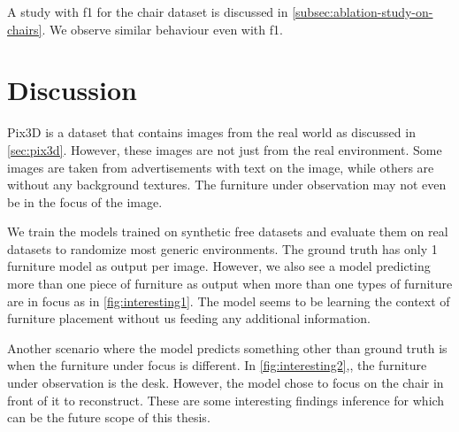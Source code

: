 A study with \gls{f1} for the chair dataset is discussed in \autoref{subsec:ablation-study-on-chairs}.
We observe similar behaviour even with \gls{f1}.



\section{Discussion}\label{subsec:discussion}

Pix3D is a dataset that contains images from the real world as discussed in \autoref{sec:pix3d}.
However, these images are not just from the real environment.
Some images are taken from advertisements with text on the image, while others are without any background textures.
The furniture under observation may not even be in the focus of the image.

We train the models trained on synthetic \gls{free} datasets and evaluate them on real datasets to randomize most generic environments.
The ground truth has only 1 furniture model as output per image.
However, we also see a model predicting more than one piece of furniture as output when more than one types of furniture are in focus as in \autoref{fig:interesting1}.
The model seems to be learning the context of furniture placement without us feeding any additional information.

Another scenario where the model predicts something other than ground truth is when the furniture under focus is different.
In \autoref{fig:interesting2},, the furniture under observation is the desk. However, the model chose to focus on the chair in front of it to reconstruct.
These are some interesting findings inference for which can be the future scope of this thesis.

